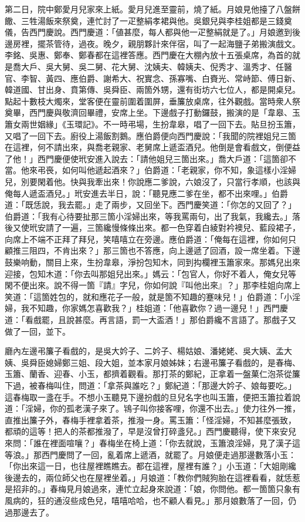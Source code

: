 第二日，院中鄭愛月兒家來上紙。愛月兒進至靈前，燒了紙。月娘見他擡了八盤餅饊、三牲湯飯來祭奠，連忙討了一疋整絹孝裙與他。{}吳銀兒與李桂姐都是三錢奠儀，告西門慶說。西門慶道：「値甚麼，每人都與他一疋整絹就是了。」月娘邀到後邊房裡，擺茶管待，過夜。晚夕，親朋夥計來伴宿，叫了一起海鹽子弟搬演戲文。李銘、吳惠、鄭奉、鄭春都在這裡答應。西門慶在大棚內放十五張桌席，為首的就是喬大戶、吳大舅、吳二舅、花大舅、沈姨夫、韓姨夫、倪秀才、溫秀才、任醫官、李智、黃四、應伯爵、謝希大、祝實念、孫寡嘴、白賚光、常峙節、傅日新、韓道國、甘出身、賁第傳、吳舜臣、兩箇外甥，還有街坊六七位人，都是開桌兒。點起十數枝大燭來，堂客便在靈前圍着圍屏，垂簾放桌席，往外觀戲。當時衆人祭奠畢，西門慶與敬濟回畢禮，安席上坐。下邊戲子打動鑼鼓，搬演的是「韋皋、玉簫女兩世姻緣」《玉環記》。不一時弔場，生扮韋皋，唱了一回下去。貼旦扮玉簫，又唱了一回下去。廚役上湯飯割鵝。應伯爵便向西門慶說：「我聞的院裡姐兒三箇在這裡，何不請出來，與喬老親家、老舅席上遞盃酒兒。他倒是會看戲文，倒便益了他！」西門慶便使玳安進入說去：「請他姐兒三箇出來。」喬大戶道：「這箇卻不當。他來弔䘮，如何叫他遞起酒來？」{}伯爵道：「老親家，你不知，象這樣小淫婦兒，別要閑着他。快與我牽出來！你說應二爹說，六娘沒了，只當行孝順，也該與俺每人遞盃酒兒。」{}玳安進去半日，說：「聽見應二爹在坐，都不出來哩。」伯爵道：「既恁說，我去罷。」走了兩步，又回坐下。西門慶笑道：「你怎的又回了？」伯爵道：「我有心待要扯那三箇小淫婦出來，等我罵兩句，出了我氣，我纔去。」落後又使玳安請了一遍，三箇纔慢條條出來。都一色穿着白綾對衿襖兒、藍段裙子，向席上不端不正拜了拜兒，笑嘻嘻立在旁邊。應伯爵道：「俺每在這裡，你如何只顧推三阻四，不肯出來？」那三箇也不答應，向上邊遞了回酒，設一席坐着。下邊鼓樂响動，關目上來，生扮韋皋，淨扮包知木，同到抅欄裡玉簫家來。那媽兒出來迎接，包知木道：「你去叫那姐兒出來。」媽云：「包官人，你好不着人，俺女兒等閑不便出來。說不得一箇『請』字兒，你如何說『叫他出來』？」那李桂姐向席上笑道：「這箇姓包的，就和應花子一般，就是箇不知趣的蹇味兒！」伯爵道：「小淫婦，我不知趣，你家媽怎喜歡我？」桂姐道：「他喜歡你？過一邊兒！」西門慶道：「看戲罷，且說甚麼。再言語，罰一大盃酒！」那伯爵纔不言語了。那戲子又做了一回，並下。

廳內左邊弔簾子看戲的，是吳大妗子、二妗子、楊姑娘、潘姥姥、吳大姨、孟大姨、吳舜臣媳婦鄭三姐、段大姐，並本家月娘姊妹；右邊弔簾子看戲的，是春梅、玉簫、蘭香、迎春、小玉，都擠着觀看。那打茶的鄭紀，正拿着一盤菓仁泡茶從簾下過，被春梅叫住，問道：「拿茶與誰吃？」鄭紀道：「那邊大妗子、娘每要吃。」這春梅取一盞在手。不想小玉聽見下邊扮戲的旦兒名字也叫玉簫，便把玉簫拉着說道：「淫婦，你的孤老漢子來了。鴇子叫你接客哩，你還不出去。」{}使力往外一推，直推出簾子外，春梅手裡拿着茶，推潑一身。罵玉簫：「怪淫婦，不知甚麼張致，都頑的這等！把人的茶都推潑了，早是沒曾打碎盞兒。」西門慶聽得，使下來安兒來問：「誰在裡面喧嚷？」春梅坐在椅上道：「你去就說，玉簫浪淫婦，見了漢子這等浪。」那西門慶問了一回，亂着席上遞酒，就罷了。月娘便走過那邊數落小玉：「你出來這一日，也往屋裡瞧瞧去。都在這裡，屋裡有誰？」小玉道：「大姐剛纔後邊去的，兩位師父也在屋裡坐着。」月娘道：「教你們賊狗胎在這裡看看，就恁惹是招非的。」春梅見月娘過來，連忙立起身來說道：「娘，你問他。都一箇箇只象有風病的，狂的通沒些成色兒，嘻嘻哈哈，也不顧人看見。」那月娘數落了一回，仍過那邊去了。

